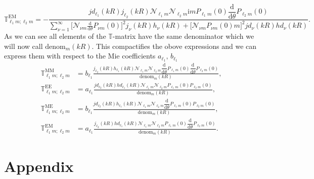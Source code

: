 \documentclass[a4paper,12pt]{scrartcl}  %
\newcommand{\imag}{\mathrm{i}}
\newcommand{\rd}{\mathrm{d}}
\begin{document}
\begin{equation}
\mathbb{T}^\mathrm{EM}_{\ell_1 m;\ell_2 m} = -
\frac{jd_{\ell_1}(kR) j_{\ell_2}(kR)
\mathcal{N}_{\ell_1 m}\mathcal{N}_{\ell_2 m}
\imag mP_{\ell_1 m}(0)\dfrac{\rd}{\rd \theta}P_{\ell_2 m}(0)
}{\displaystyle \sum_{\nu=1}^\infty
\Big[
\mathcal{N}_{\nu m} \frac{\rd}{\rd \theta}P_{\nu m}(0)
\Big]^2 j_\nu(kR) h_\nu(kR)
+
\Big[
\mathcal{N}_{\nu m} P_{\nu m}(0) m
\Big]^2jd_\nu(kR) hd_\nu(kR)
}.
\end{equation}
As we can see all elements of the $\mathbb{T}$-matrix have the same denominator which we will now call $\mathrm{denom}_m(kR)$. This compactifies the obove expressions and we can express them with respect to the Mie coefficients $a_{\ell_1},\,b_{\ell_1}$
\begin{align}
\mathbb{T}^\mathrm{MM}_{\ell_1 m;\ell_2 m} &= b_{\ell_1} \frac{
j_{\ell_2}(kR)h_{\ell_1}(kR) \mathcal{N}_{\ell_1 m}\mathcal{N}_{\ell_2 m}
\dfrac{\rd}{\rd \theta}P_{\ell_1 m}(0)\dfrac{\rd}{\rd \theta} P_{\ell_2 m}(0)
}{
\mathrm{denom}_m(kR)
},\\
\mathbb{T}^\mathrm{EE}_{\ell_1 m;\ell_2 m} &= a_{\ell_1} \frac{
jd_{\ell_2}(kR)hd_{\ell_1}(kR) \mathcal{N}_{\ell_1 m}\mathcal{N}_{\ell_2 m}
P_{\ell_1 m}(0) P_{\ell_2 m}(0)
}{
\mathrm{denom}_m(kR)
},\\
\mathbb{T}^\mathrm{ME}_{\ell_1 m;\ell_2 m} &= b_{\ell_1} \frac{
jd_{\ell_2}(kR)h_{\ell_1}(kR) \mathcal{N}_{\ell_1 m}\mathcal{N}_{\ell_2 m}
\dfrac{\rd}{\rd \theta}P_{\ell_1 m}(0) P_{\ell_2 m}(0)
}{
\mathrm{denom}_m(kR)
},\\
\mathbb{T}^\mathrm{EM}_{\ell_1 m;\ell_2 m} &= a_{\ell_1} \frac{
j_{\ell_2}(kR)hd_{\ell_1}(kR) \mathcal{N}_{\ell_1 m}\mathcal{N}_{\ell_2 m}
P_{\ell_1 m}(0)\dfrac{\rd}{\rd \theta} P_{\ell_2 m}(0)
}{
\mathrm{denom}_m(kR)
}.
\end{align}

\section{Appendix}
\end{document}
